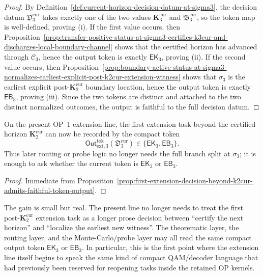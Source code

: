 \begin{proof}
By Definition~\ref{def:current-horizon-decision-datum-at-sigma3}, the decision datum \(\mathfrak D_3^{\mathrm{cur}}\) takes exactly one of the two values \(\mathbf K_3^{\mathrm{cur}}\) and \(\mathfrak B_3^{\mathrm{cur}}\), so the token map is well-defined, proving (i). If the first value occurs, then Proposition~\ref{prop:transfer-positive-status-at-sigma3-certifies-k3cur-and-discharges-local-boundary-channel} shows that the certified horizon has advanced through \(\mathcal C_3\), hence the output token is exactly \(\mathsf{EK}_3\), proving (ii). If the second value occurs, then Proposition~\ref{prop:boundary-active-status-at-sigma3-normalizes-earliest-explicit-post-k2cur-extension-witness} shows that \(\sigma_3\) is the earliest explicit post-\(\mathbf K_2^{\mathrm{cur}}\) boundary location, hence the output token is exactly \(\mathsf{EB}_3\), proving (iii). Since the two tokens are distinct and attached to the two distinct normalized outcomes, the output is faithful to the full decision datum.
\end{proof}

\begin{corollary}
\label{cor:extension-tasks-at-first-post-k2cur-slot-are-now-token-normalized}
On the present OP~1 extension line, the first extension task beyond the certified horizon \(\mathbf K_2^{\mathrm{cur}}\) can now be recorded by the compact token
\[
  \mathsf{Out}^{\mathrm{tok}}_{\mathrm{ext},3}(\mathfrak D_3^{\mathrm{cur}})\in\{\mathsf{EK}_3,\mathsf{EB}_3\}.
\]
Thus later routing or probe logic no longer needs the full branch split at \(\sigma_3\); it is enough to ask whether the current token is \(\mathsf{EK}_3\) or \(\mathsf{EB}_3\).
\end{corollary}

\begin{proof}
Immediate from Proposition~\ref{prop:first-extension-decision-beyond-k2cur-admits-faithful-token-output}.
\end{proof}

\begin{remark}
\label{rem:what-first-extension-output-tokens-now-buy}
The gain is small but real. The present line no longer needs to treat the first post-\(\mathbf K_2^{\mathrm{cur}}\) extension task as a longer prose decision between ``certify the next horizon'' and ``localize the earliest new witness''. The theorematic layer, the routing layer, and the Monte-Carlo/probe layer may all read the same compact output token \(\mathsf{EK}_3\) or \(\mathsf{EB}_3\). In particular, this is the first point where the extension line itself begins to speak the same kind of compact QAM/decoder language that had previously been reserved for reopening tasks inside the retained OP kernels.
\end{remark}



